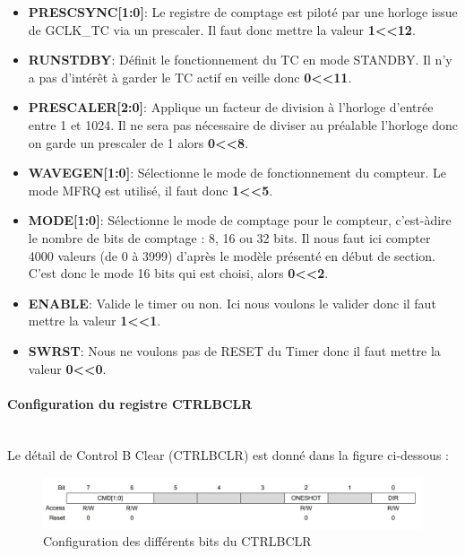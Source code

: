 \documentclass[a4paper]{article}
\begin{document}
	\begin{itemize}
		\item {\bf PRESCSYNC[1:0]}: Le registre de comptage est piloté par une horloge issue de GCLK\_TC via un prescaler. Il faut donc mettre la valeur {\bf 1\textless\textless12}.~~\\
		\item {\bf RUNSTDBY}: Définit le fonctionnement du TC en mode STANDBY. Il n’y a pas d’intérêt à garder le TC actif en veille donc {\bf 0\textless\textless11}.~~\\
		\item {\bf PRESCALER[2:0]}: Applique un facteur de division à l’horloge d’entrée entre 1 et 1024. Il ne sera pas nécessaire de diviser au préalable l’horloge donc on garde un prescaler de 1 alors {\bf 0\textless\textless8}.~~\\
		\item {\bf WAVEGEN[1:0]}: Sélectionne le mode de fonctionnement du compteur. Le mode MFRQ est utilisé, il faut donc {\bf 1\textless\textless5}.~~\\
		\item {\bf MODE[1:0]}: Sélectionne le mode de comptage pour le compteur, c’est-àdire le nombre de bits de comptage : 8, 16 ou 32 bits. Il nous faut ici compter 4000 valeurs (de 0 à 3999) d’après le modèle présenté en début de section. C’est donc le mode 16 bits qui est choisi, alors {\bf 0\textless\textless2}.~~\\
		\item {\bf ENABLE}: Valide le timer ou non. Ici nous voulons le valider donc il faut mettre la valeur {\bf 1\textless\textless1}.~~\\
		\item {\bf SWRST}: Nous ne voulons pas de RESET du Timer donc il faut mettre la valeur {\bf 0\textless\textless0}.~~\\
	\end{itemize}
	
	\paragraph{Configuration du registre CTRLBCLR} 
	~~\\
	Le détail de Control B Clear (CTRLBCLR) est donné dans la figure ci-dessous :
	\begin{figure}[H]
		\centering
		\includegraphics[width=0.9\linewidth]{CTRLBCLR.jpg}
		\caption{Configuration des différents bits du CTRLBCLR}
	\end{figure}
	
\end{document}
